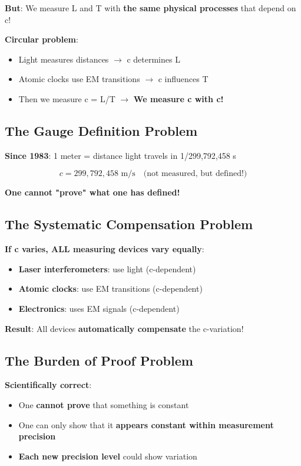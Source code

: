 \documentclass[12pt,a4paper]{article}
\begin{document}
	\textbf{But}: We measure L and T with \textbf{the same physical processes} that depend on c!
	
	\textbf{Circular problem}:
	\begin{itemize}
		\item Light measures distances $\rightarrow$ c determines L
		\item Atomic clocks use EM transitions $\rightarrow$ c influences T
		\item Then we measure c = L/T $\rightarrow$ \textbf{We measure c with c!}
	\end{itemize}
	
	\subsection{The Gauge Definition Problem}
	
	\textbf{Since 1983}: 1 meter = distance light travels in 1/299,792,458 s
	
	\begin{equation}
		c = 299,792,458 \text{ m/s} \quad \text{(not measured, but defined!)}
	\end{equation}
	
	\textbf{One cannot "prove" what one has defined!}
	
	\subsection{The Systematic Compensation Problem}
	
	\textbf{If c varies, ALL measuring devices vary equally}:
	\begin{itemize}
		\item \textbf{Laser interferometers}: use light (c-dependent)
		\item \textbf{Atomic clocks}: use EM transitions (c-dependent)
		\item \textbf{Electronics}: uses EM signals (c-dependent)
	\end{itemize}
	
	\textbf{Result}: All devices \textbf{automatically compensate} the c-variation!
	
	\subsection{The Burden of Proof Problem}
	
	\textbf{Scientifically correct}:
	\begin{itemize}
		\item One \textbf{cannot prove} that something is constant
		\item One can only show that it \textbf{appears constant within measurement precision}
		\item \textbf{Each new precision level} could show variation
	\end{itemize}
	
\end{document}
